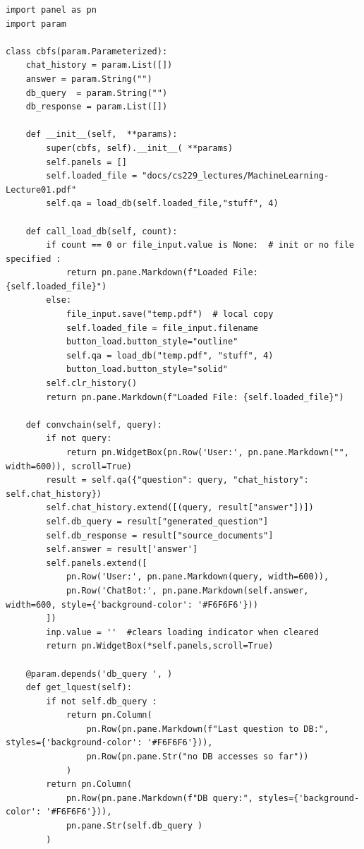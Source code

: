 \documentclass{article}
\begin{document}
\begin{lstlisting}[style=pythonstyle, caption={Python Code for Class and Dashboard Implementation}]
import panel as pn
import param

class cbfs(param.Parameterized):
    chat_history = param.List([])
    answer = param.String("")
    db_query  = param.String("")
    db_response = param.List([])

    def __init__(self,  **params):
        super(cbfs, self).__init__( **params)
        self.panels = []
        self.loaded_file = "docs/cs229_lectures/MachineLearning-Lecture01.pdf"
        self.qa = load_db(self.loaded_file,"stuff", 4)

    def call_load_db(self, count):
        if count == 0 or file_input.value is None:  # init or no file specified :
            return pn.pane.Markdown(f"Loaded File: {self.loaded_file}")
        else:
            file_input.save("temp.pdf")  # local copy
            self.loaded_file = file_input.filename
            button_load.button_style="outline"
            self.qa = load_db("temp.pdf", "stuff", 4)
            button_load.button_style="solid"
        self.clr_history()
        return pn.pane.Markdown(f"Loaded File: {self.loaded_file}")

    def convchain(self, query):
        if not query:
            return pn.WidgetBox(pn.Row('User:', pn.pane.Markdown("", width=600)), scroll=True)
        result = self.qa({"question": query, "chat_history": self.chat_history})
        self.chat_history.extend([(query, result["answer"])])
        self.db_query = result["generated_question"]
        self.db_response = result["source_documents"]
        self.answer = result['answer']
        self.panels.extend([
            pn.Row('User:', pn.pane.Markdown(query, width=600)),
            pn.Row('ChatBot:', pn.pane.Markdown(self.answer, width=600, style={'background-color': '#F6F6F6'}))
        ])
        inp.value = ''  #clears loading indicator when cleared
        return pn.WidgetBox(*self.panels,scroll=True)

    @param.depends('db_query ', )
    def get_lquest(self):
        if not self.db_query :
            return pn.Column(
                pn.Row(pn.pane.Markdown(f"Last question to DB:", styles={'background-color': '#F6F6F6'})),
                pn.Row(pn.pane.Str("no DB accesses so far"))
            )
        return pn.Column(
            pn.Row(pn.pane.Markdown(f"DB query:", styles={'background-color': '#F6F6F6'})),
            pn.pane.Str(self.db_query )
        )


\end{lstlisting}
\end{document}

